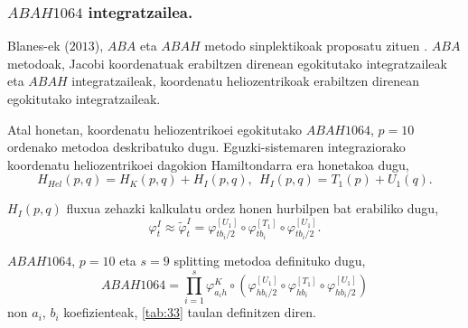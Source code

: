 \subsubsection*{$ABAH1064$ integratzailea.}

Blanes-ek ($2013$), $ABA$ eta $ABAH$ metodo sinplektikoak proposatu zituen \cite{Blanes2013,Farres2013}. $ABA$ metodoak, Jacobi koordenatuak erabiltzen direnean egokitutako integratzaileak eta $ABAH$ integratzaileak, koordenatu heliozentrikoak erabiltzen direnean egokitutako integratzaileak.

Atal honetan, koordenatu heliozentrikoei egokitutako $ABAH1064$, $p=10$ ordenako metodoa deskribatuko dugu.  
Eguzki-sistemaren integraziorako koordenatu heliozentrikoei dagokion Hamiltondarra era honetakoa dugu,
\begin{equation*}
H_{Hel}(p,q)=H_K(p,q)+H_I(p,q), \ \ H_I(p,q)=T_1(p)+U_1(q). 
\end{equation*}

$H_I(p,q)$ fluxua zehazki kalkulatu ordez honen hurbilpen bat erabiliko dugu,
\begin{equation*}
\varphi_t^I \approx \tilde{\varphi}_t^I= \varphi_{{tb_i}/{2}}^{[U_1]} \circ \varphi_{tb_i}^{[T_1]} \circ \varphi_{{tb_i}/{2}}^{[U_1]}.
\end{equation*}

$ABAH1064$, $p=10$ eta $s=9$ splitting metodoa definituko dugu,
\begin{equation*}
ABAH1064=\prod\limits_{i=1}^{s} \varphi_{a_ih}^K \circ (\varphi_{{hb_i}/{2}}^{[U_1]} \circ \varphi_{hb_i}^{[T_1]} \circ \varphi_{{hb_i}/{2}}^{[U_1]})
\end{equation*}
non $a_i$, $b_i$ koefizienteak, \ref{tab:33} taulan definitzen diren.  

\begin{table}
\centering
\caption[$ABAH1064$ splitting metodoa.] 
{\small{$ABAH1064$ splitting metodoa \cite{Blanes2013}.}}
\label{tab:33}       %
\centering
{}
\end{table}


